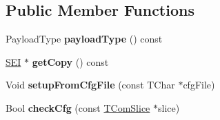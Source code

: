 \subsection*{Public Member Functions}
\begin{DoxyCompactItemize}
\item 
\mbox{\label{class_s_e_i_overlay_info_a9e15d37dd704a5b9dc63be78d59430f6}} 
Payload\+Type {\bfseries payload\+Type} () const
\item 
\mbox{\label{class_s_e_i_overlay_info_aa803415929c40d511c868a2f5d100118}} 
\hyperlink{class_s_e_i}{S\+EI} $\ast$ {\bfseries get\+Copy} () const
\item 
\mbox{\label{class_s_e_i_overlay_info_aa5b89f8b759204ea536548d346c6fc66}} 
Void {\bfseries setup\+From\+Cfg\+File} (const T\+Char $\ast$cfg\+File)
\item 
\mbox{\label{class_s_e_i_overlay_info_a8cd50d8cb0d172b68cf15f68c170894c}} 
Bool {\bfseries check\+Cfg} (const \hyperlink{class_t_com_slice}{T\+Com\+Slice} $\ast$slice)
\end{DoxyCompactItemize}
